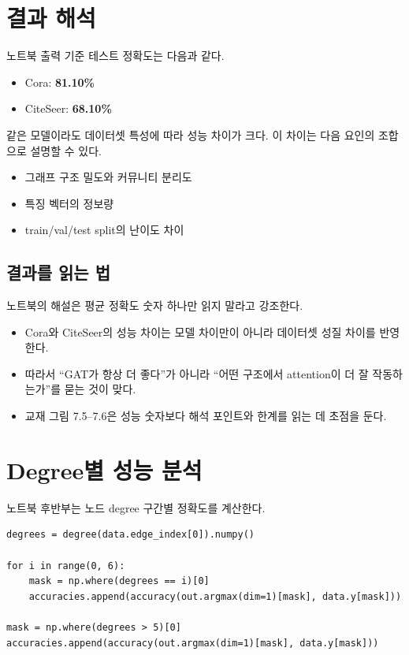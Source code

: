 \documentclass[11pt,a4paper]{article}
\begin{document}
\section{결과 해석}

노트북 출력 기준 테스트 정확도는 다음과 같다.
\begin{itemize}[leftmargin=*]
  \item Cora: \textbf{81.10\%}
  \item CiteSeer: \textbf{68.10\%}
\end{itemize}

같은 모델이라도 데이터셋 특성에 따라 성능 차이가 크다. 이 차이는 다음 요인의 조합으로 설명할 수 있다.
\begin{itemize}[leftmargin=*]
  \item 그래프 구조 밀도와 커뮤니티 분리도
  \item 특징 벡터의 정보량
  \item train/val/test split의 난이도 차이
\end{itemize}

\subsection*{결과를 읽는 법}
노트북의 해설은 평균 정확도 숫자 하나만 읽지 말라고 강조한다.
\begin{itemize}[leftmargin=*]
  \item Cora와 CiteSeer의 성능 차이는 모델 차이만이 아니라 데이터셋 성질 차이를 반영한다.
  \item 따라서 ``GAT가 항상 더 좋다''가 아니라 ``어떤 구조에서 attention이 더 잘 작동하는가''를 묻는 것이 맞다.
  \item 교재 그림 7.5--7.6은 성능 숫자보다 해석 포인트와 한계를 읽는 데 초점을 둔다.
\end{itemize}

\section{Degree별 성능 분석}

노트북 후반부는 노드 degree 구간별 정확도를 계산한다.

\begin{lstlisting}
degrees = degree(data.edge_index[0]).numpy()

for i in range(0, 6):
    mask = np.where(degrees == i)[0]
    accuracies.append(accuracy(out.argmax(dim=1)[mask], data.y[mask]))

mask = np.where(degrees > 5)[0]
accuracies.append(accuracy(out.argmax(dim=1)[mask], data.y[mask]))
\end{lstlisting}
\end{document}
